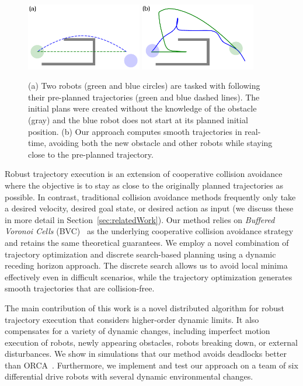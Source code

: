 \documentclass{svproc}
\begin{document}
\begin{figure}
\includegraphics[width=0.45\textwidth]{images/swap2_initial.pdf}
\hfill
\includegraphics[width=0.45\textwidth]{images/swap2_final.pdf}
\caption{(a) Two robots (green and blue circles) are tasked with following their pre-planned trajectories (green and blue dashed lines).
The initial plans were created without the knowledge of the obstacle (gray) and the blue robot does not start at its planned initial position.
(b) Our approach computes smooth trajectories in real-time, avoiding both the new obstacle and other robots while staying close to the pre-planned trajectory.
}
\label{fig:swap2}
\end{figure}

Robust trajectory execution is an extension of cooperative collision avoidance where the objective is to stay as close to the originally planned trajectories as possible.
In contrast, traditional collision avoidance methods frequently only take a desired velocity, desired goal state, or desired action as input (we discuss these in more detail in Section~\ref{sec:relatedWork}).
Our method relies on \emph{Buffered Voronoi Cells} (BVC)~\cite{bufferedVoronoiCells} as the underlying cooperative collision avoidance strategy and retains the same theoretical guarantees.
We employ a novel combination of trajectory optimization and discrete search-based planning using a dynamic receding horizon approach.
The discrete search allows us to avoid local minima effectively even in difficult scenarios, while the trajectory optimization generates smooth trajectories that are collision-free.

The main contribution of this work is a novel distributed algorithm for robust trajectory execution that considers higher-order dynamic limits.
It also compensates for a variety of dynamic changes, including imperfect motion execution of robots, newly appearing obstacles, robots breaking down, or external disturbances.
We show in simulations that our method avoids deadlocks better than ORCA~\cite{orca}.
Furthermore, we implement and test our approach on a team of six differential drive robots with several dynamic environmental changes.
\end{document}
